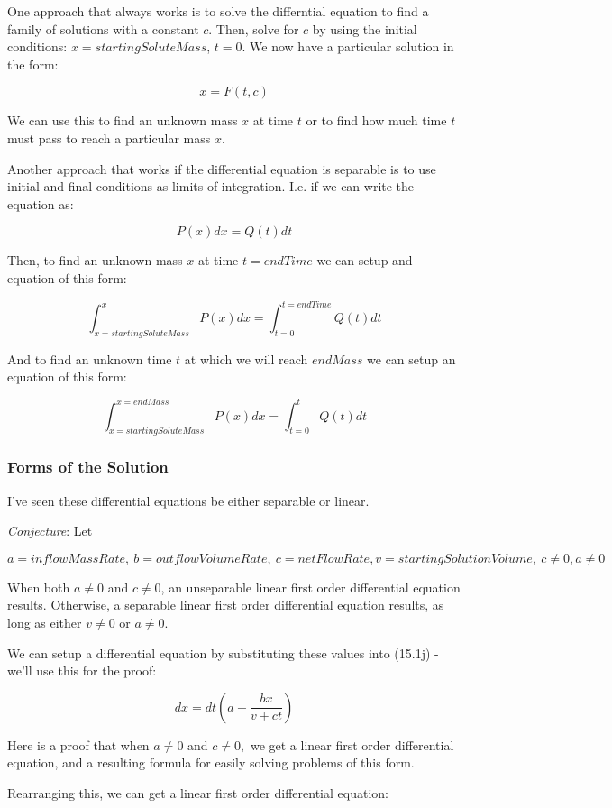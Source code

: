 \documentclass{article}
\begin{document}
One approach that always works is to solve the differntial equation to find a family of solutions with a constant $c$. Then, solve for $c$ by using the initial conditions: $x = startingSoluteMass$, $t = 0$. We now have a particular solution in the form:

\[ x = F(t, c) \]

We can use this to find an unknown mass $x$ at time $t$ or to find how much time $t$ must pass to reach a particular mass $x$.

Another approach that works if the differential equation is separable is to use initial and final conditions as limits of integration. I.e. if we can write the equation as:

\[ P(x)dx = Q(t)dt \]

Then, to find an unknown mass $x$ at time $t = endTime$ we can setup and equation of this form:

\[ \int_{x=startingSoluteMass}^x{P(x) dx} = \int_{t=0}^{t=endTime}{Q(t) dt} \]

And to find an unknown time $t$ at which we will reach $endMass$ we can setup an equation of this form:

\[ \int_{x=startingSoluteMass}^{x=endMass}{P(x) dx} = \int_{t=0}^{t}{Q(t) dt} \]

\subsubsection{Forms of the Solution}

I've seen these differential equations be either separable or linear.

\emph{Conjecture}:
Let

\[ a = inflowMassRate,~b = outflowVolumeRate,~c = netFlowRate, v= startingSolutionVolume, ~c\neq0, a\neq0 \]

When both $a \neq 0$ and $c \neq 0$, an unseparable linear first order differential equation results. Otherwise, a separable linear first order differential equation results, as long as either $v \neq 0$ or $a \neq 0$.

We can setup a differential equation by substituting these values into (15.1j) - we'll use this for the proof:

\[ \tag{15.3j} dx = dt(a + \frac{bx}{v+ct}) \]

Here is a proof that when $a \neq 0$ and $c \neq 0,$ we get a linear first order differential equation, and a resulting formula for easily solving problems of this form.

Rearranging this, we can get a linear first order differential equation:
\end{document}
